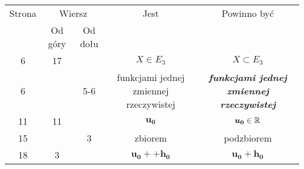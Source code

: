 \documentclass[a4paper,11pt]{article}
\numberwithin{equation}{section}
\begin{document}
\begin{center}

  \begin{tabular}{|c|c|c|c|c|}
    \hline
    Strona & \multicolumn{2}{c|}{Wiersz} & Jest
                              & Powinno być \\ \cline{2-3}
    & Od góry & Od dołu & & \\
    \hline
    6   & 17 & & $X \in E_{ 3 }$ & $X \subset E_{ 3 }$ \\
    6   & & 5-6 & funkcjami jednej zmiennej rzeczywistej
           & \textbf{\textit{funkcjami jednej zmiennej rzeczywistej}} \\
    11  & 11 & & $\boldsymbol{u_{ 0 }}$ & $\boldsymbol{u_{ 0 }} \in \mathbb{R}$ \\
    15  & &  3 & zbiorem & podzbiorem \\
    18  &  3 & & $\boldsymbol{u_{ 0 }} + + \boldsymbol{h_{ 0 }}$
           & $\boldsymbol{u_{ 0 }} + \boldsymbol{h_{ 0 }}$ \\
    \hline
  \end{tabular}

\end{center}

\VerSpaceFour
























\end{document}
